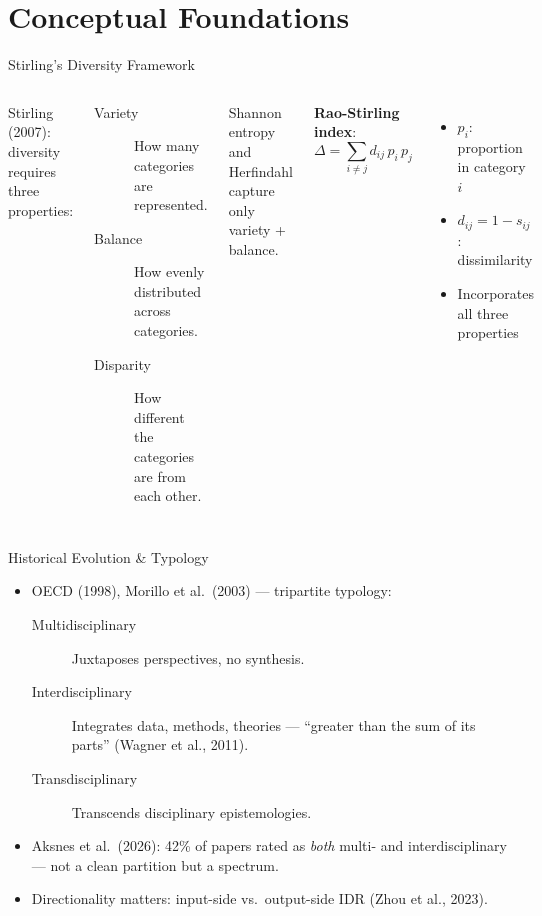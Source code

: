 \documentclass[aspectratio=169,10pt]{beamer}
\begin{document}
\section{Conceptual Foundations}

\begin{frame}{Stirling's Diversity Framework}
\begin{columns}[T]
Stirling (2007): diversity requires three properties:
\begin{description}
  \item[Variety] How many categories are represented.
  \item[Balance] How evenly distributed across categories.
  \item[Disparity] How different the categories are from each other.
\end{description}
\medskip
Shannon entropy and Herfindahl capture only variety + balance.

\textbf{Rao-Stirling index}:
\[
  \Delta = \sum_{i \neq j} d_{ij}\, p_i\, p_j
\]
\begin{itemize}
  \item $p_i$: proportion in category $i$
  \item $d_{ij} = 1 - s_{ij}$: dissimilarity
  \item Incorporates all three properties
\end{itemize}
\end{columns}
\end{frame}

\begin{frame}{Historical Evolution \& Typology}
\begin{itemize}
  \item OECD (1998), Morillo et al.\ (2003) --- tripartite typology:
  \begin{description}
    \item[Multidisciplinary] Juxtaposes perspectives, no synthesis.
    \item[Interdisciplinary] Integrates data, methods, theories ---
          ``greater than the sum of its parts'' (Wagner et al., 2011).
    \item[Transdisciplinary] Transcends disciplinary epistemologies.
  \end{description}
  \item Aksnes et al.\ (2026): 42\% of papers rated as \emph{both}
        multi- and interdisciplinary --- not a clean partition but a spectrum.
  \item Directionality matters: input-side vs.\ output-side IDR
        (Zhou et al., 2023).
\end{itemize}
\end{frame}
\end{document}
